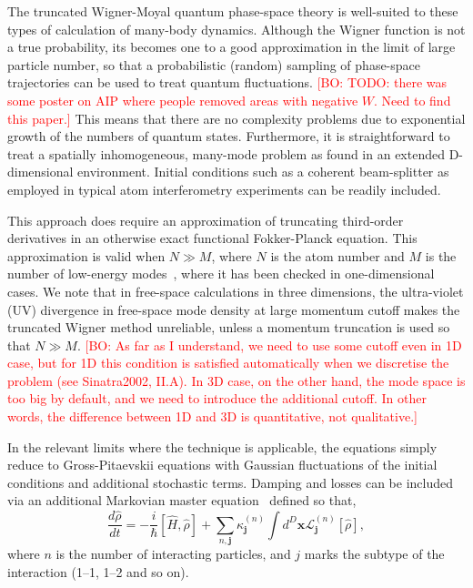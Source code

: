\documentclass[aps,prl,twocolumn,showpacs,amsmath,amssymb,superscriptaddress]{revtex4-1}
\newcommand{\bogdansremark}[1]{\textcolor{red}{{[}BO: #1{]}}}
\newcommand{\bx}{\boldsymbol{x}}
\begin{document}
The truncated Wigner-Moyal quantum phase-space theory is well-suited
to these types of calculation of many-body dynamics.
Although the Wigner function is not a true probability,
its becomes one to a good approximation in the limit of large particle number,
so that a probabilistic (random) sampling of phase-space trajectories
can be used to treat quantum fluctuations.
	\bogdansremark{TODO: there was some poster on AIP where people removed areas with negative $W$.
	Need to find this paper.}
This means that there are no complexity problems due to exponential growth
of the numbers of quantum states.
Furthermore, it is straightforward to treat a spatially inhomogeneous,
many-mode problem as found in an extended D-dimensional environment.
Initial conditions such as a coherent beam-splitter
as employed in typical atom interferometry experiments can be readily included.

This approach does require an approximation of truncating third-order derivatives
in an otherwise exact functional Fokker-Planck equation.
This approximation is valid when $N \gg M$, where $N$ is the atom number and
$M$ is the number of low-energy modes~\cite{Drummond1993,Sinatra2002,Norrie2006},
where it has been checked in one-dimensional cases.
We note that in free-space calculations in three dimensions,
the ultra-violet (UV) divergence in free-space mode density at large momentum cutoff
makes the truncated Wigner method unreliable,
unless a momentum truncation is used so that $N \gg M$.
	\bogdansremark{As far as I understand, we need to use some cutoff even in 1D case,
	but for 1D this condition is satisfied automatically when we discretise the problem
	(see Sinatra2002, II.A).
	In 3D case, on the other hand, the mode space is too big by default,
	and we need to introduce the additional cutoff.
	In other words, the difference between 1D and 3D is quantitative, not qualitative.}

In the relevant limits where the technique is applicable,
the equations simply reduce to Gross-Pitaevskii equations with Gaussian fluctuations
of the initial conditions and additional stochastic terms.
Damping and losses can be included via an additional Markovian master equation~\cite{Jack2002}
defined so that,
\begin{equation}
	\frac{d\hat{\rho}}{dt} = -\frac{i}{\hbar} \left[ \hat{H}, \hat{\rho} \right] +
	\sum_{n,\mathbf{j}} \kappa_{\mathbf{j}}^{(n)}
	\int d^D\bx \mathcal{L}_{\mathbf{j}}^{(n)} \left[ \hat{\rho} \right],
\end{equation}
where $n$ is the number of interacting particles,
and $j$ marks the subtype of the interaction (1--1, 1--2 and so on).
\end{document}
